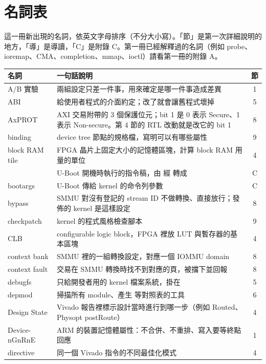 \clearpage
\section{名詞表}

這一冊新出現的名詞，依英文字母排序（不分大小寫）。「節」是第一次詳細說明的地方，「導」是導讀，「C」是附錄 C。第一冊已經解釋過的名詞（例如 probe、ioremap、CMA、completion、mmap、ioctl）請看第一冊的附錄 A。

\small
\begin{xltabular}{\textwidth}{l X c}
\toprule
名詞 & 一句話說明 & 節 \\
\midrule
\endhead
A/B 實驗 & 兩組設定只差一件事，用來確定是哪一件事造成差異 & 1 \\
ABI & 給使用者程式的介面約定；改了就會讓舊程式壞掉 & 5 \\
AxPROT & AXI 交易附帶的 3 個保護位元；bit 1 是 0 表示 Secure、1 表示 Non-secure。第 4 節的 RTL 改動就是改它的 bit 1 & 8 \\
binding & device tree 節點的規格檔，寫明可以有哪些屬性 & 9 \\
block RAM tile & FPGA 晶片上固定大小的記憶體區塊，計算 block RAM 用量的單位 & 4 \\
 & U-Boot 開機時執行的指令稿，由  經  轉成 & C \\
bootargs & U-Boot 傳給 kernel 的命令列參數 & C \\
bypass & SMMU 對沒有登記的 stream ID 不做轉換、直接放行；發佈的 kernel 是這樣設定 & 8 \\
checkpatch & kernel 的程式風格檢查腳本  & 9 \\
CLB & configurable logic block，FPGA 裡放 LUT 與暫存器的基本區塊 & 4 \\
context bank & SMMU 裡的一組轉換設定，對應一個 IOMMU domain & 8 \\
context fault & 交易在 SMMU 轉換時找不到對應的頁，被擋下並回報 & 8 \\
debugfs & 只給開發者用的 kernel 檔案系統，掛在  & 5 \\
depmod & 掃描所有 module、產生  等對照表的工具 & 6 \\
Design State & Vivado 報告裡標示設計當時進行到哪一步（例如 Routed、Physopt postRoute） & 4 \\
Device-nGnRnE & ARM 的裝置記憶體屬性：不合併、不重排、寫入要等終點回應 & 1 \\
directive & 同一個 Vivado 指令的不同最佳化模式 & 4 \\

\end{xltabular}
